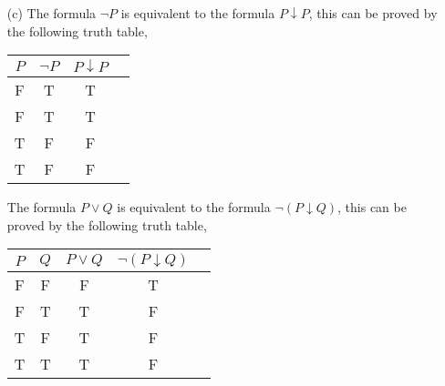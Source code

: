 \documentclass{article} %
\begin{document}
\begin{enumerate}
\begin{itemize}
        \item[(c)] The formula $\neg P$ is equivalent to the formula $P \downarrow P$, this can be proved by the following truth table,
        \begin{center}
            \begin{tabular}{cccc}
                $P$ & $\neg P$ & $P \downarrow P$ \\
                \hline
                F & T & T \\
                F & T & T \\
                T & F & F \\
                T & F & F \\
            \end{tabular}
        \end{center} 

        The formula $P \lor Q$ is equivalent to the formula $\neg (P \downarrow Q)$, this can be proved by the following truth table,

        \begin{center}
        \begin{tabular}{ccccc}
            $P$ & $Q$ & $P \lor Q$ & $\neg (P \downarrow Q)$ \\
            \hline
            F & F & F & T \\
            F & T & T & F \\
            T & F & T & F \\
            T & T & T & F \\
        \end{tabular}
        \end{center}

    \end{itemize}

        
    \end{enumerate}
\end{document}
